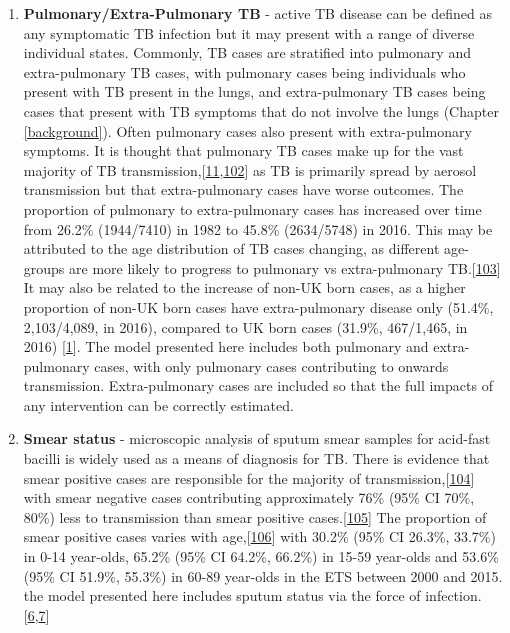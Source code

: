 \documentclass[11pt,twoside]{bristolthesis}
\begin{document}
  \begin{enumerate}
  \def\labelenumi{\arabic{enumi}.}
  \item
    \textbf{Pulmonary/Extra-Pulmonary TB} - active TB disease can be defined as any symptomatic TB infection but it may present with a range of diverse individual states. Commonly, TB cases are stratified into pulmonary and extra-pulmonary TB cases, with pulmonary cases being individuals who present with TB present in the lungs, and extra-pulmonary TB cases being cases that present with TB symptoms that do not involve the lungs (Chapter \ref{background}). Often pulmonary cases also present with extra-pulmonary symptoms. It is thought that pulmonary TB cases make up for the vast majority of TB transmission,{[}\protect\hyperlink{ref-Sepkowitz1996}{11},\protect\hyperlink{ref-Mathema2018}{102}{]} as TB is primarily spread by aerosol transmission but that extra-pulmonary cases have worse outcomes. The proportion of pulmonary to extra-pulmonary cases has increased over time from 26.2\% (1944/7410) in 1982 to 45.8\% (2634/5748) in 2016. This may be attributed to the age distribution of TB cases changing, as different age-groups are more likely to progress to pulmonary vs extra-pulmonary TB.{[}\protect\hyperlink{ref-Lefebvre2017}{103}{]} It may also be related to the increase of non-UK born cases, as a higher proportion of non-UK born cases have extra-pulmonary disease only (51.4\%, 2,103/4,089, in 2016), compared to UK born cases (31.9\%, 467/1,465, in 2016) {[}\protect\hyperlink{ref-PHE2017}{1}{]}. The model presented here includes both pulmonary and extra-pulmonary cases, with only pulmonary cases contributing to onwards transmission. Extra-pulmonary cases are included so that the full impacts of any intervention can be correctly estimated.
  \item
    \textbf{Smear status} - microscopic analysis of sputum smear samples for acid-fast bacilli is widely used as a means of diagnosis for TB. There is evidence that smear positive cases are responsible for the majority of transmission,{[}\protect\hyperlink{ref-PMID:13148535}{104}{]} with smear negative cases contributing approximately 76\% (95\% CI 70\%, 80\%) less to transmission than smear positive cases.{[}\protect\hyperlink{ref-Tostmann2008}{105}{]} The proportion of smear positive cases varies with age,{[}\protect\hyperlink{ref-Piccini2014}{106}{]} with 30.2\% (95\% CI 26.3\%, 33.7\%) in 0-14 year-olds, 65.2\% (95\% CI 64.2\%, 66.2\%) in 15-59 year-olds and 53.6\% (95\% CI 51.9\%, 55.3\%) in 60-89 year-olds in the ETS between 2000 and 2015. the model presented here includes sputum status via the force of infection.{[}\protect\hyperlink{ref-Anderson1991}{6},\protect\hyperlink{ref-Keeling2007}{7}{]}

\end{enumerate}
\end{document}
